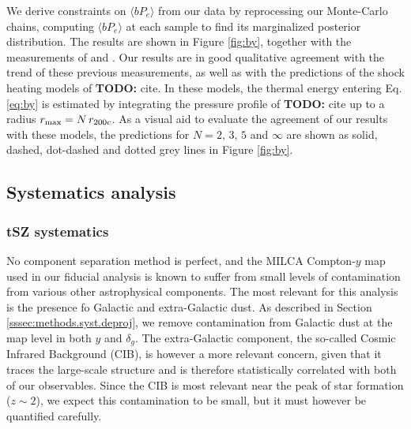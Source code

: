 \documentclass[useAMS,usenatbib]{mn2e}
\newcommand{\todo}[1]{{\bf TODO:} #1}
\begin{document}
      We derive constraints on $\langle bP_e\rangle$ from our data by reprocessing our Monte-Carlo chains, computing $\langle bP_e\rangle$ at each sample to find its marginalized posterior distribution. The results are shown in Figure \ref{fig:by}, together with the measurements of \citep{2016A&A...594A..27P} and \cite{2019arXiv190413347P}. Our results are in good qualitative agreement with the trend of these previous measurements, as well as with the predictions of the shock heating models of \todo{cite}. In these models, the thermal energy entering Eq. \ref{eq:by} is estimated by integrating the pressure profile of \todo{cite} up to a radius $r_{\rm max}=N\,r_{200c}$. As a visual aid to evaluate the agreement of our results with these models, the predictions for $N=2,\,3,\,5$ and $\infty$ are shown as solid, dashed, dot-dashed and dotted grey lines in Figure \ref{fig:by}.

  \subsection{Systematics analysis}\label{ssec:results.syst}
    \subsubsection{tSZ systematics}\label{sssec:results.syst.y}
      No component separation method is perfect, and the MILCA Compton-$y$ map used in our fiducial analysis is known to suffer from small levels of contamination from various other astrophysical components. The most relevant for this analysis is the presence fo Galactic and extra-Galactic dust. As described in Section \ref{sssec:methods.syst.deproj}, we remove contamination from Galactic dust at the map level in both $y$ and $\delta_g$. The extra-Galactic component, the so-called Cosmic Infrared Background (CIB), is however a more relevant concern, given that it traces the large-scale structure and is therefore statistically correlated with both of our observables. Since the CIB is most relevant near the peak of star formation ($z\sim2$), we expect this contamination to be small, but it must however be quantified carefully.
      
\end{document}
